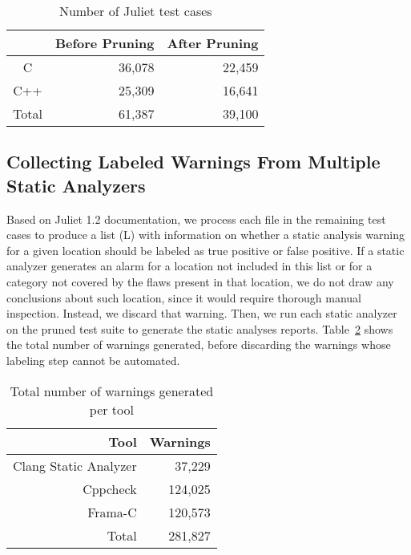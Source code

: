   \begin{table}
    \begin{center}
        \begin{tabular}{crr}\hline
          & Before Pruning & After Pruning \\
        \hline
          C & 36,078 & 22,459 \\
          C++ & 25,309 & 16,641 \\
          Total & 61,387 & 39,100 \\ \hline
        \end{tabular}
        \caption{Number of Juliet test cases}\label{tab:juliet_numbers}
    \end{center}
\end{table}

\subsection{Collecting Labeled Warnings From Multiple Static Analyzers}\label{sec:data:labels}

Based on Juliet 1.2 documentation, we process each file in the remaining test
cases to produce a list (L) with information on whether a static analysis
warning for a given location should be labeled as true positive or false
positive. If a static analyzer generates an alarm for a location not included
in this list or for a category not covered by the flaws present in that location, we do not
draw any conclusions about such location, since it would require thorough
manual inspection. Instead, we discard that warning. Then, we run each static
analyzer on the pruned test suite to generate the static analyses reports.
Table~\ref{tab:unlabeled_warnings} shows the total number of warnings
generated, before discarding the warnings whose labeling step cannot be
automated.

  \begin{table}
    \begin{center}
        \begin{tabular}{rr}\hline
          Tool & Warnings \\
        \hline
          Clang Static Analyzer & 37,229 \\
          Cppcheck & 124,025 \\
          Frama-C & 120,573 \\
          Total & 281,827 \\ \hline
        \end{tabular}
        \caption{Total number of warnings generated per tool}\label{tab:unlabeled_warnings}
    \end{center}
\end{table}


